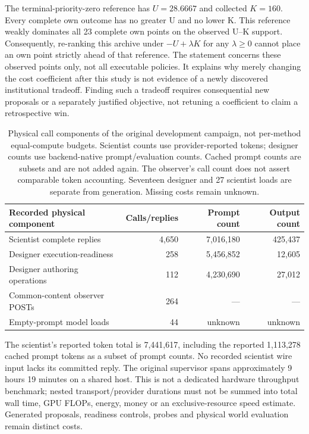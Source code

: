 The terminal-priority-zero reference has $U=28.6667$ and collected $K=160$.
Every complete own outcome has no greater U and no lower K. This reference
weakly dominates all 23 complete own points on the observed U--K support.
Consequently, re-ranking this archive under $-U+\lambda K$ for any
$\lambda\geq0$ cannot place an own point strictly ahead of that reference.
The statement concerns these observed points only, not all executable policies.
It explains why merely changing the cost coefficient after this study is not
evidence of a newly discovered institutional tradeoff. Finding such a tradeoff
requires consequential new proposals or a separately justified objective, not
retuning a coefficient to claim a retrospective win.

\begin{table}[t]
\centering\small
\begin{tabular}{lrrr}
\toprule
Recorded physical component & Calls/replies & Prompt count & Output count\\
\midrule
Scientist complete replies & 4,650 & 7,016,180 & 425,437\\
Designer execution-readiness & 258 & 5,456,852 & 12,605\\
Designer authoring operations & 112 & 4,230,690 & 27,012\\
Common-content observer POSTs & 264 & --- & ---\\
Empty-prompt model loads & 44 & unknown & unknown\\
\bottomrule
\end{tabular}
\caption{Physical call components of the original development campaign,
not per-method equal-compute budgets. Scientist counts use provider-reported
tokens; designer counts use backend-native prompt/evaluation counts. Cached
prompt counts are subsets and are not added again. The observer's call count
does not assert comparable token accounting. Seventeen designer and 27 scientist
loads are separate from generation. Missing costs remain unknown.}
\label{tab:corrected-choice-physical-cost}
\end{table}

The scientist's reported token total is 7,441,617, including the reported
1,113,278 cached prompt tokens as a subset of prompt counts. No recorded
scientist wire input lacks its committed reply. The original supervisor spans
approximately 9 hours 19 minutes on a shared host. This is not a dedicated
hardware throughput benchmark; nested transport/provider durations must not be
summed into total wall time, GPU FLOPs, energy, money or an exclusive-resource
speed estimate. Generated proposals, readiness controls, probes and physical
world evaluation remain distinct costs.


